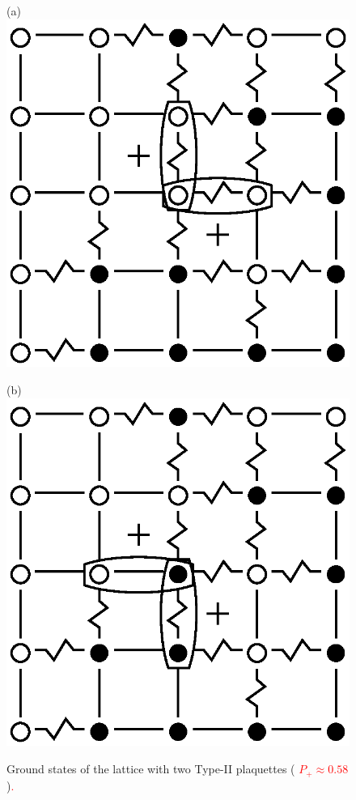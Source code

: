 \documentclass[preprint,12pt]{elsarticle}
\begin{document}
	\begin{figure}[H]
		\centering
		\begin{minipage}[h]{0.25\linewidth}
			\centering(a)
			\includegraphics[width=1\linewidth]{pictures/Cl5x5_Type2_gs1.eps}
		\end{minipage}
		\hspace{15pt}
		\begin{minipage}[h]{0.25\linewidth}
			\centering(b)
			\includegraphics[width=1\linewidth]{pictures/Cl5x5_Type2_gs2.eps}
		\end{minipage}
		\caption{Ground states of the lattice with two Type-II plaquettes (\textcolor{red}{  $P_+\approx0.58$})\textcolor{red}{.}}
		\label{fig:5x5.22F}
	\end{figure}
	
\end{document}

